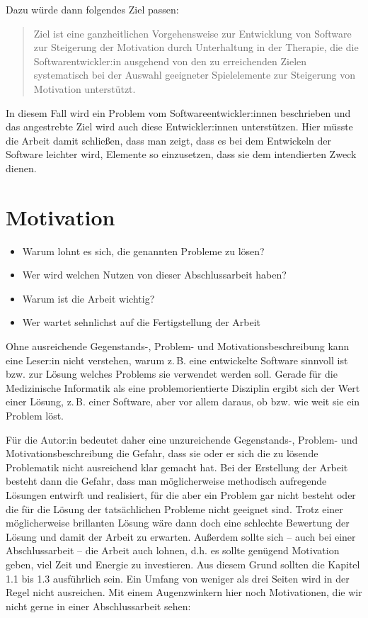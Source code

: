 Dazu würde dann folgendes Ziel passen:
\blockquote{Ziel ist eine ganzheitlichen Vorgehensweise zur Entwicklung von Software zur Steigerung der Motivation durch Unterhaltung in der Therapie, die die Softwarentwickler:in ausgehend von den zu erreichenden Zielen systematisch bei der Auswahl geeigneter Spielelemente zur Steigerung von Motivation unterstützt.}
In diesem Fall wird ein Problem vom Softwareentwickler:innen beschrieben und das angestrebte Ziel wird auch diese Entwickler:innen unterstützen.
Hier müsste die Arbeit damit schließen, dass man zeigt, dass es bei dem Entwickeln der Software leichter wird, Elemente so einzusetzen, dass sie dem intendierten Zweck dienen.

\section{Motivation}

\begin{itemize}
\item Warum lohnt es sich, die genannten Probleme zu lösen?
\item Wer wird welchen Nutzen von dieser Abschlussarbeit haben?
\item Warum ist die Arbeit wichtig?
\item Wer wartet sehnlichst auf die Fertigstellung der Arbeit
\end{itemize}

Ohne ausreichende Gegenstands-, Problem- und Motivationsbeschreibung kann eine Leser:in nicht verstehen, warum z.\,B. eine entwickelte Software sinnvoll ist bzw. zur Lösung welches Problems sie verwendet werden soll.
Gerade für die Medizinische Informatik als eine problemorientierte Disziplin ergibt sich der Wert einer Lösung, z.\,B. einer Software, aber vor allem daraus, ob bzw. wie weit sie ein Problem löst.

Für die Autor:in bedeutet daher eine unzureichende Gegenstands-, Problem- und Motivationsbeschreibung die Gefahr, dass sie oder er sich die zu lösende Problematik nicht ausreichend klar gemacht hat.
Bei der Erstellung der Arbeit besteht dann die Gefahr, dass man möglicherweise methodisch aufregende Lösungen entwirft und realisiert, für die aber ein Problem gar nicht besteht oder die für die Lösung der tatsächlichen Probleme nicht geeignet sind.
Trotz einer möglicherweise brillanten Lösung wäre dann doch eine schlechte Bewertung der Lösung und damit der Arbeit zu erwarten.
Außerdem sollte sich -- auch bei einer Abschlussarbeit -- die Arbeit auch lohnen, d.h. es sollte genügend Motivation geben, viel Zeit und Energie zu investieren.
Aus diesem Grund sollten die Kapitel 1.1 bis 1.3 ausführlich sein.
Ein Umfang von weniger als drei Seiten wird in der Regel nicht ausreichen.
Mit einem Augenzwinkern hier noch Motivationen, die wir nicht gerne in einer Abschlussarbeit sehen:\\
~~\\

